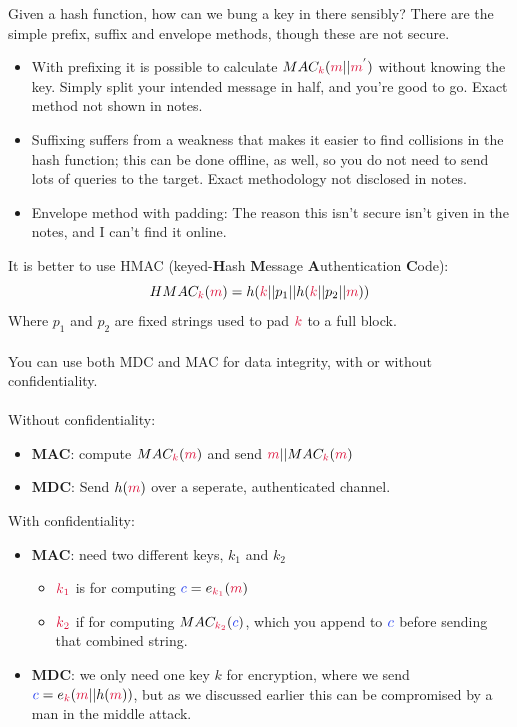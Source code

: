     Given a hash function, how can we bung a key in there sensibly? There are the simple prefix, suffix and envelope methods, though these are not secure.
    \begin{itemize}
        \item With prefixing it is possible to calculate $MAC_{\ck}(\cm||\cm^{'})$ without knowing the key. Simply split your intended message in half, and you're good to go. Exact method not shown in notes.
        \item Suffixing suffers from a weakness that makes it easier to find collisions in the hash function; this can be done offline, as well, so you do not need to send lots of queries to the target. Exact methodology not disclosed in notes.
        \item Envelope method with padding: The reason this isn't secure isn't given in the notes, and I can't find it online. %
    \end{itemize}
    It is better to use HMAC (keyed-\textbf{H}ash \textbf{M}essage \textbf{A}uthentication \textbf{C}ode):
    $$HMAC_{\ck}(\cm) = h(\ck||p_{1}||h(\ck||p_{2}||\cm))$$
    Where $p_{1}$ and $p_{2}$ are fixed strings used to pad $\ck$ to a full block.\\
    \\
    You can use both MDC and MAC for data integrity, with or without confidentiality.\\
    \\
    Without confidentiality:
    \begin{itemize}
        \item \textbf{MAC}: compute $MAC_{\ck}(\cm)$ and send $\cm||MAC_{\ck}(\cm)$
        \item \textbf{MDC}: Send $h(\cm)$ over a seperate, authenticated channel.
    \end{itemize}
    With confidentiality:
    \begin{itemize}
        \item \textbf{MAC}: need two different keys, $k_{1}$ and $k_{2}$
        \begin{itemize}
            \item $\csubk{1}$ is for computing $\cc = e_{\csubk{1}}(\cm)$
            \item $\csubk{2}$ if for computing $MAC_{\csubk{2}}(\cc)$, which you append to $\cc$ before sending that combined string.
        \end{itemize}
        \item \textbf{MDC}: we only need one key $k$ for encryption, where we send $\cc = e_{\ck}(\cm||h(\cm))$, but as we discussed earlier this can be compromised by a man in the middle attack.
    \end{itemize}

